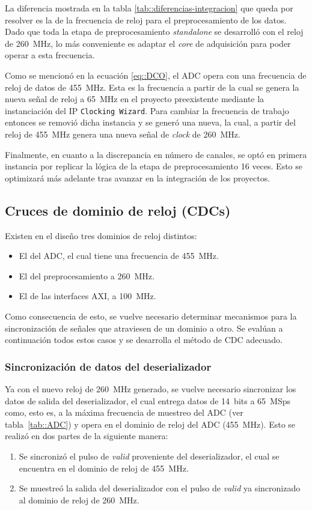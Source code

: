 \documentclass[../../main.tex]{subfiles}
\begin{document}
La diferencia mostrada en la tabla \ref{tab::diferencias-integracion} que queda por resolver es la de la frecuencia de reloj para el preprocesamiento de los datos. Dado que toda la etapa de preprocesamiento \textit{standalone} se desarrolló con el reloj de 260~MHz, lo más conveniente es adaptar el \textit{core} de adquisición para poder operar a esta frecuencia.

Como se mencionó en la ecuación \ref{eq::DCO}, el ADC opera con una frecuencia de reloj de datos de 455~MHz. Esta es la frecuencia a partir de la cual se genera la nueva señal de reloj a 65~MHz en el proyecto preexistente mediante la instanciación del IP \texttt{Clocking Wizard}. Para cambiar la frecuencia de trabajo entonces se removió dicha instancia y se generó una nueva, la cual, a partir del reloj de 455~MHz genera una nueva señal de \textit{clock} de 260~MHz.

Finalmente, en cuanto a la discrepancia en número de canales, se optó en primera instancia por replicar la lógica de la etapa de preprocesamiento 16 veces. Esto se optimizará más adelante tras avanzar en la integración de los proyectos.

\subsection{Cruces de dominio de reloj (CDCs)}\label{subsec::cdcs-integracion}
Existen en el diseño tres dominios de reloj distintos:
\begin{itemize}
    \item El del ADC, el cual tiene una frecuencia de 455~MHz.
    \item El del preprocesamiento a 260~MHz.
    \item El de las interfaces AXI, a 100~MHz.
\end{itemize}
Como consecuencia de esto, se vuelve necesario determinar mecanismos para la sincronización de señales que atraviesen de un dominio a otro. Se evalúan a continuación todos estos casos y se desarrolla el método de CDC adecuado.
\subsubsection{Sincronización de datos del deserializador}
Ya con el nuevo reloj de 260~MHz generado, se vuelve necesario sincronizar los datos de salida del deserializador, el cual entrega datos de 14~bits a 65~MSps como, esto es, a la máxima frecuencia de muestreo del ADC (ver tabla~\ref{tab::ADC}) y opera en el dominio de reloj del ADC (455~MHz). Esto se realizó en dos partes de la siguiente manera:
\begin{enumerate}
    \item Se sincronizó el pulso de \textit{valid} proveniente del deserializador, el cual se encuentra en el dominio de reloj de 455~MHz. 
    \item Se muestreó la salida del deserializador con el pulso de \textit{valid} ya sincronizado al dominio de reloj de 260~MHz.
\end{enumerate}
\end{document}
